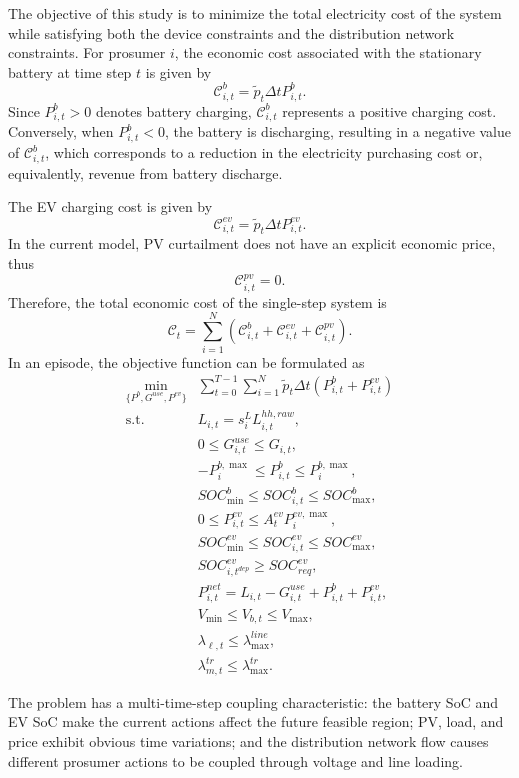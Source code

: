 The objective of this study is to minimize the total electricity cost of the system while satisfying both the device constraints and the distribution network constraints. For prosumer \(i\), the economic cost associated with the stationary battery at time step \(t\) is given by
\[
  \mathcal{C}^b_{i,t}
  =
  \tilde p_t \Delta t P^b_{i,t}.
\]
Since \(P^b_{i,t}>0\) denotes battery charging, \(\mathcal{C}^b_{i,t}\) represents a positive charging cost. Conversely, when \(P^b_{i,t}<0\), the battery is discharging, resulting in a negative value of \(\mathcal{C}^b_{i,t}\), which corresponds to a reduction in the electricity purchasing cost or, equivalently, revenue from battery discharge.

The EV charging cost is given by
\[
  \mathcal{C}^{ev}_{i,t}
  =
  \tilde p_t \Delta t P^{ev}_{i,t}.
\]
In the current model, PV curtailment does not have an explicit economic price, thus
\[
  \mathcal{C}^{pv}_{i,t}=0.
\]
Therefore, the total economic cost of the single-step system is
\[
  \mathcal{C}_t
  =
  \sum_{i=1}^{N}
  \left(
  \mathcal{C}^b_{i,t}
  +
  \mathcal{C}^{ev}_{i,t}
  +
  \mathcal{C}^{pv}_{i,t}
  \right).
\]
In an episode, the objective function can be formulated as
\[
\begin{array}{ll}
\displaystyle \min_{\{P^b,G^{use},P^{ev}\}}
&
\displaystyle
\sum_{t=0}^{T-1}\sum_{i=1}^{N}
\tilde p_t\Delta t
\left(P^b_{i,t}+P^{ev}_{i,t}\right)
\\[3mm]
\mathrm{s.t.}
&
L_{i,t}=s^L_i L^{hh,raw}_{i,t},\\[1mm]
&
0\le G^{use}_{i,t}\le G_{i,t},\\[1mm]
&
-P^{b,\max}_i\le P^b_{i,t}\le P^{b,\max}_i,\\[1mm]
&
SOC^b_{\min}\le SOC^b_{i,t}\le SOC^b_{\max},\\[1mm]
&
0\le P^{ev}_{i,t}\le A^{ev}_tP^{ev,\max}_i,\\[1mm]
&
SOC^{ev}_{\min}\le SOC^{ev}_{i,t}\le SOC^{ev}_{\max},\\[1mm]
&
SOC^{ev}_{i,t^{dep}}\ge SOC^{ev}_{req},\\[1mm]
&
P^{net}_{i,t}=L_{i,t}-G^{use}_{i,t}+P^b_{i,t}+P^{ev}_{i,t},\\[1mm]
&
V_{\min}\le V_{b,t}\le V_{\max},\\[1mm]
&
\lambda_{\ell,t}\le \lambda^{line}_{\max},\\[1mm]
&
\lambda^{tr}_{m,t}\le \lambda^{tr}_{\max}.
\end{array}
\]

The problem has a multi-time-step coupling characteristic: the battery SoC and EV SoC make the current actions affect the future feasible region; PV, load, and price exhibit obvious time variations; and the distribution network flow causes different prosumer actions to be coupled through voltage and line loading. 
